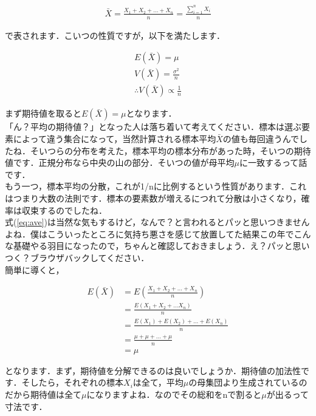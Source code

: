 \documentclass[11pt,a4paper]{ujreport} 	%
\begin{document}
\begin{align}
  \bar{X} = \frac{X_1 + X_2+...+X_n}{n} = \frac{\sum_{i=1}^n X_i}{n}
\end{align}

で表されます．こいつの性質ですが，以下を満たします．

\begin{align}
  E(\bar{X}) = \mu
  \label{eq:ave}\\
  V(\bar{X}) = \frac{\sigma^2}{n}\\
  \therefore V(\bar{X}) \propto \frac{1}{n}
  \label{eq:var}
\end{align}
  
まず期待値を取ると$E(\bar{X}) = \mu$となります．\\

「ん？平均の期待値？」となった人は落ち着いて考えてください．標本は選ぶ要素によって違う集合になって，当然計算される標本平均$\bar{X}$の値も毎回違うんでしたね．そいつらの分布を考えた，標本平均の標本分布があった時，そいつの期待値です．正規分布なら中央の山の部分．そいつの値が母平均$\mu$に一致するって話です．\\

もう一つ，標本平均の分散，これが1/nに比例するという性質があります．これはつまり大数の法則です．標本の要素数が増えるにつれて分散は小さくなり，確率は収束するのでしたね．\\

式(\ref{eq:ave})は当然な気もするけど，なんで？と言われるとパッと思いつきませんよね．僕はこういったところに気持ち悪さを感じて放置してた結果この年でこんな基礎やる羽目になったので，ちゃんと確認しておきましょう．え？パッと思いつく？ブラウザバックしてください．\\

簡単に導くと，

\begin{align}
  E(\bar{X}) &= E(\frac{X_1 + X_2 + ...+X_n}{n})\\
             &= \frac{E(X_1+X_2+...X_n)}{n}\\
             &= \frac{E(X_1) + E(X_2)+...+E(X_n)}{n}\\
             &= \frac{\mu+\mu+...+\mu}{n}\\
             &=\mu 
\end{align}

となります．まず，期待値を分解できるのは良いでしょうか．期待値の加法性です．そしたら，それぞれの標本$X_i$は全て，平均$\mu$の母集団より生成されているのだから期待値は全て$\mu$になりますよね．なのでその総和をnで割ると$\mu$が出るって寸法です．\\
\end{document}
